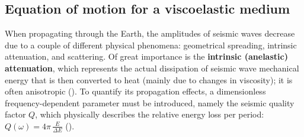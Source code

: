 \subsection{Equation of motion for a viscoelastic medium}
\label{ch:eq_motion_visco}
When propagating through the Earth, the amplitudes of seismic waves decrease due to a couple of different physical phenomena: geometrical spreading, intrinsic attenuation, and scattering. Of great importance is the \textbf{intrinsic (anelastic) attenuation}, which represents the actual dissipation of seismic wave mechanical energy that is then converted to heat (mainly due to changes in viscosity); it is often anisotropic (\cite{Bai:19}). To quantify its propagation effects, a dimensionless frequency-dependent parameter must be introduced, namely the seismic quality factor $Q$, which physically describes the relative energy loss per period: $Q(\omega) = 4\pi\,\frac{E}{\Delta E}$ (\cite{oconnell:78}). 

